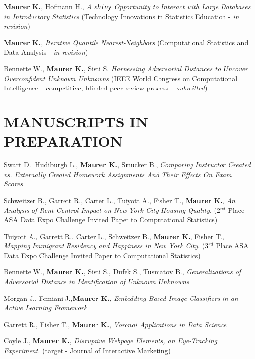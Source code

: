 \documentclass[margin, 10pt]{res}\usepackage[]{graphicx}\usepackage[]{color}
\begin{document}
\begin{resume}
\textbf{Maurer K.}, Hofmann H., {\it A \texttt{shiny} Opportunity to Interact with Large Databases in Introductory Statistics} (Technology Innovations in Statistics Education - {\it in revision})

\textbf{Maurer K.}, {\it Iterative Quantile Nearest-Neighbors} (Computational Statistics and Data Analysis - {\it in revision})

Bennette W., \textbf{Maurer K.}, Sisti S. \textit{Harnessing Adversarial Distances to Uncover Overconfident Unknown Unknowns} (IEEE World Congress on Computational Intelligence -- competitive, blinded peer review process -- {\it submitted}) 


\section{MANUSCRIPTS IN PREPARATION}

Swart D.{\bf *}, Hudiburgh L., \textbf{Maurer K.}, Smucker B., {\it Comparing Instructor Created vs. Externally Created Homework Assignments And Their Effects On Exam Scores}

Schweitzer B.{\bf *}, Garrett R.{\bf *}, Carter L.{\bf *}, Tuiyott A.{\bf *}, Fisher T., \textbf{Maurer K.}, {\it An Analysis of Rent Control Impact on New York City Housing Quality}. (2$^{nd}$ Place ASA Data Expo Challenge Invited Paper to Computational Statistics)

Tuiyott A.{\bf *}, Garrett R.{\bf *}, Carter L.{\bf *}, Schweitzer B.{\bf *}, \textbf{Maurer K.}, Fisher T., {\it Mapping Immigrant Residency and Happiness in New York City}. (3$^{rd}$ Place ASA Data Expo Challenge Invited Paper to Computational Statistics)

Bennette W., \textbf{Maurer K.}, Sisti S., Dufek S.{\bf *}, Tusmatov B.{\bf *}, {\it Generalizations of Adversarial Distance in Identification of Unknown Unknowns}

Morgan J.{\bf *}, Femiani J.,\textbf{Maurer K.}, {\it Embedding Based Image Classifiers in an Active Learning Framework}

Garrett R.{\bf *}, Fisher T., \textbf{Maurer K.}, {\it Voronoi Applications in Data Science}

Coyle J., \textbf{Maurer K.}, {\it Disruptive Webpage Elements, an Eye-Tracking Experiment}. (target - Journal of Interactive Marketing) 


\end{resume}
\end{document}
